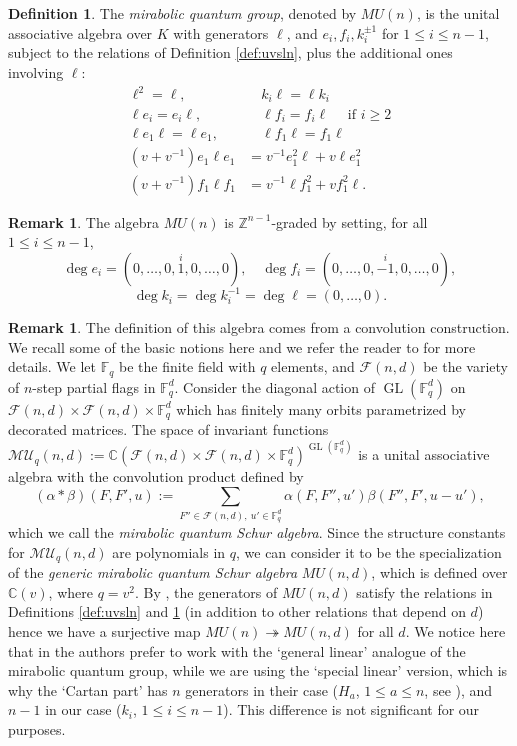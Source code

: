 \documentclass{amsart}
\numberwithin{equation}{section}
\theoremstyle{theorem}
\theoremstyle{definition}
\newtheorem{remark}[theorem]{Remark}
\newtheorem{definition}[theorem]{Definition}
\newcommand{\CC}{\mathbb{C}}
\newcommand{\ZZ}{\mathbb{Z}}
\newcommand{\FF}{\mathbb{F}}
\newcommand{\ff}{\mathcal{F}}
\newcommand{\mm}{\mathcal{M}}
\newcommand{\uu}{\mathcal{U}}
\newcommand{\GL}{\operatorname{GL}}
\newcommand{\onto}{\twoheadrightarrow}
\begin{document}
\begin{definition}\label{def:mir-sln}
The \emph{mirabolic quantum group}, denoted by $MU(n)$, is the unital associative algebra over $K$ with generators $\ell$, and $e_i, f_i, k_i^{\pm 1}$ for $1\leq i\leq n-1$,  subject to the relations of Definition \ref{def:uvsln}, plus the additional ones involving $\ell$:
\begin{align}\label{eq:mun.1} \ell^2=\ell,&\quad k_i\ell=\ell k_i\\
\label{eq:mun.2} \ell e_i=e_i\ell,&\quad \ell f_i=f_i\ell \quad\text{ if }i\geq 2\\
\label{eq:mun.3} \ell e_1\ell=\ell e_1,&\quad \ell f_1\ell=f_1\ell\\
\label{eq:mun.4} (v+v^{-1})e_1\ell e_1 &= v^{-1}e_1^2\ell + v\ell e_1^2\\
\label{eq:mun.5} (v+v^{-1})f_1\ell f_1 &= v^{-1}\ell f_1^2 + vf_1^2\ell.\end{align}
\end{definition}
\begin{remark}\label{rem:grading}
The algebra $MU(n)$ is $\ZZ^{n-1}$-graded by setting, for all $1\leq i\leq n-1$,
$$\deg e_i=(0,\ldots,0,\stackrel{i}{1},0,\ldots,0),\quad \deg f_i=(0,\ldots,0,\stackrel{i}{-1},0,\ldots,0),$$
$$\deg k_i=\deg k_i^{-1}=\deg \ell=(0,\ldots,0).$$
\end{remark}
\begin{remark}The definition of this algebra comes from a convolution construction. We recall some of the basic notions here and we refer the reader to \cite[\S 2]{R15} for more details. We let $\FF_q$ be the finite field with $q$ elements, and $\ff(n,d)$ be the variety of $n$-step partial flags in $\FF_q^d$. Consider the diagonal action of $\GL(\FF_q^d)$ on $\ff(n,d)\times\ff(n,d)\times \FF_q^d$ which has finitely many orbits parametrized by decorated matrices. The space of invariant functions $\mm\uu_q(n,d):=\CC\left(\ff(n,d)\times\ff(n,d)\times \FF_q^d\right)^{\GL(\FF_q^d)}$ is a unital associative algebra with the convolution product defined by
\begin{equation} \label{eq:convo}
(\alpha*\beta)(F,F',u):=\sum_{F''\in\ff(n,d),~u'\in\FF_q^d}\alpha(F,F'',u')\beta(F'',F',u-u'),
\end{equation}
which we call the \emph{mirabolic quantum Schur algebra}. Since the structure constants for $\mm\uu_q(n,d)$ are polynomials in $q$, we can consider it to be the specialization of the \emph{generic mirabolic quantum Schur algebra} $MU(n,d)$, which is defined over $\CC(v)$, where $q=v^2$. By \cite{FZM}, the generators of $MU(n,d)$ satisfy the relations in Definitions \ref{def:uvsln} and \ref{def:mir-sln} (in addition to other relations that depend on $d$) hence we have a surjective map $MU(n)\onto MU(n,d)$ for all $d$. We notice here that in \cite{FZM} the authors prefer to work with the `general linear' analogue of the mirabolic quantum group, while we are using the `special linear' version, which is why the `Cartan part' has $n$ generators in their case ($H_a$, $1\leq a\leq n$, see \cite[Def. 2.1.2]{FZM}), and $n-1$ in our case ($k_i$, $1\leq i\leq n-1$). This difference is not significant for our purposes.
\end{remark}
\end{document}

